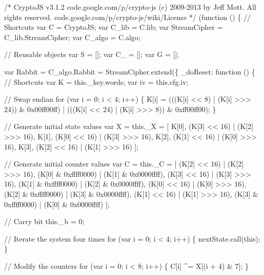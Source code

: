 \begin{DoxyCodeInclude}
\textcolor{comment}{/*}
\textcolor{comment}{CryptoJS v3.1.2}
\textcolor{comment}{code.google.com/p/crypto-js}
\textcolor{comment}{(c) 2009-2013 by Jeff Mott. All rights reserved.}
\textcolor{comment}{code.google.com/p/crypto-js/wiki/License}
\textcolor{comment}{*/}
(\textcolor{keyword}{function} () \{
    \textcolor{comment}{// Shortcuts}
    var C = CryptoJS;
    var C\_lib = C.lib;
    var StreamCipher = C\_lib.StreamCipher;
    var C\_algo = C.algo;

    \textcolor{comment}{// Reusable objects}
    var S  = [];
    var C\_ = [];
    var G  = [];

    var Rabbit = C\_algo.Rabbit = StreamCipher.extend(\{
        \_doReset: \textcolor{keyword}{function} () \{
            \textcolor{comment}{// Shortcuts}
            var K = this.\_key.words;
            var iv = this.cfg.iv;

            \textcolor{comment}{// Swap endian}
            \textcolor{keywordflow}{for} (var i = 0; i < 4; i++) \{
                K[i] = (((K[i] << 8)  | (K[i] >>> 24)) & 0x00ff00ff) |
                       (((K[i] << 24) | (K[i] >>> 8))  & 0xff00ff00);
            \}

            \textcolor{comment}{// Generate initial state values}
            var X = this.\_X = [
                K[0], (K[3] << 16) | (K[2] >>> 16),
                K[1], (K[0] << 16) | (K[3] >>> 16),
                K[2], (K[1] << 16) | (K[0] >>> 16),
                K[3], (K[2] << 16) | (K[1] >>> 16)
            ];

            \textcolor{comment}{// Generate initial counter values}
            var C = this.\_C = [
                (K[2] << 16) | (K[2] >>> 16), (K[0] & 0xffff0000) | (K[1] & 0x0000ffff),
                (K[3] << 16) | (K[3] >>> 16), (K[1] & 0xffff0000) | (K[2] & 0x0000ffff),
                (K[0] << 16) | (K[0] >>> 16), (K[2] & 0xffff0000) | (K[3] & 0x0000ffff),
                (K[1] << 16) | (K[1] >>> 16), (K[3] & 0xffff0000) | (K[0] & 0x0000ffff)
            ];

            \textcolor{comment}{// Carry bit}
            this.\_b = 0;

            \textcolor{comment}{// Iterate the system four times}
            \textcolor{keywordflow}{for} (var i = 0; i < 4; i++) \{
                nextState.call(\textcolor{keyword}{this});
            \}

            \textcolor{comment}{// Modify the counters}
            \textcolor{keywordflow}{for} (var i = 0; i < 8; i++) \{
                C[i] ^= X[(i + 4) & 7];
            \}


\end{DoxyCodeInclude}
